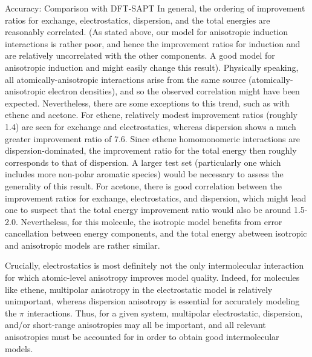 \begin{subsection}{Accuracy: Comparison with DFT-SAPT}
In general, the ordering of improvement ratios for exchange,
electrostatics, dispersion, and the total energies are reasonably correlated. (As stated above, our model
for anisotropic induction interactions is rather poor, and hence the
improvement ratios for induction and \dhf are relatively uncorrelated with the
other components. A good model for anisotropic induction and
\dhf might easily change this result). Physically speaking, all atomically-anisotropic
interactions arise from the same source (atomically-anisotropic
electron densities), and so the observed correlation might have been expected.
Nevertheless, there are some exceptions to this trend, such as with ethene and
acetone.
For ethene, relatively modest improvement ratios (roughly 1.4) are seen for exchange and
electrostatics, whereas dispersion shows a much greater improvement ratio of
7.6. Since ethene homomonomeric interactions are dispersion-dominated, the
improvement ratio for the total energy then roughly corresponds to that of dispersion.
A larger test set (particularly one which includes more non-polar
aromatic species) would be necessary to assess the generality of this result.
For acetone, there is good correlation between the improvement ratios for
exchange, electrostatics, and dispersion, which might lead one to suspect that
the total energy improvement ratio would also be around 1.5-2.0. Nevertheless, for this molecule, the
isotropic model benefits from error cancellation between energy components,
and the total energy a\rmse between isotropic and anisotropic models are
rather similar. 

Crucially, 
electrostatics is most definitely not the only intermolecular interaction for which
atomic-level anisotropy improves model quality. Indeed, for molecules like ethene, multipolar
anisotropy in the electrostatic model is relatively unimportant, whereas dispersion anisotropy is
essential for accurately modeling the $\pi$ interactions.
Thus, for a given system, multipolar electrostatic, dispersion, and/or short-range
anisotropies may all be important, and all relevant 
anisotropies must be accounted for in order to obtain good intermolecular
models.

\end{subsection}
